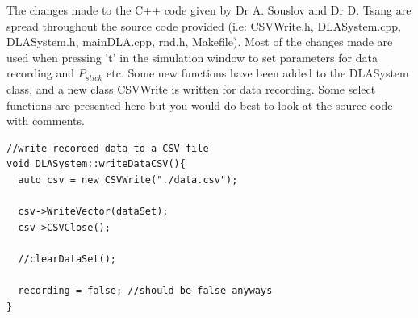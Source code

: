\documentclass[12pt]{report} %
\begin{document}
  The changes made to the C++ code given by Dr A. Souslov and Dr D. Tsang are spread throughout the source code provided (i.e: CSVWrite.h, DLASystem.cpp, DLASystem.h, mainDLA.cpp, rnd.h, Makefile). Most of the changes made are used when pressing 't' in the simulation window to set parameters for data recording and $P_{stick}$ etc. Some new functions have been added to the DLASystem class, and a new class CSVWrite is written for data recording. Some select functions are presented here but you would do best to look at the source code with comments.

\begin{lstlisting}
//write recorded data to a CSV file
void DLASystem::writeDataCSV(){
  auto csv = new CSVWrite("./data.csv");

  csv->WriteVector(dataSet);
  csv->CSVClose();

  //clearDataSet();

  recording = false; //should be false anyways
}
\end{lstlisting}
\end{document}

